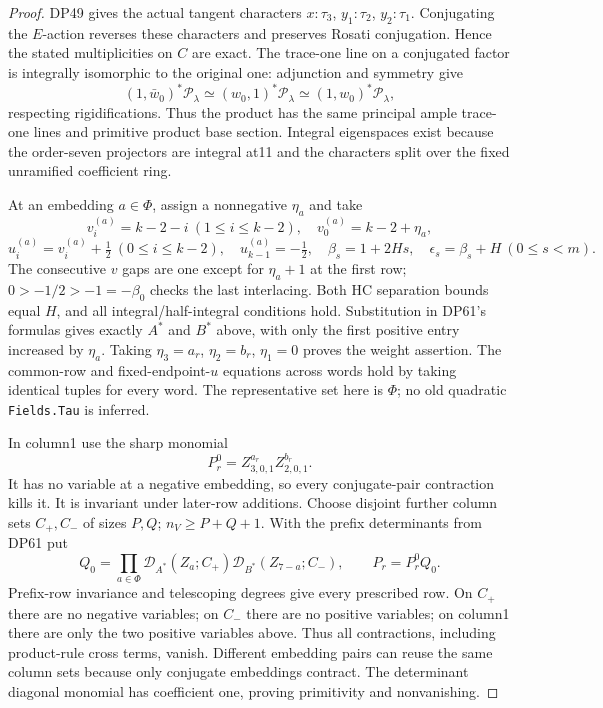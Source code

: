 \documentclass[11pt,a4paper]{article}
\theoremstyle{definition}\newtheorem{remark}[theorem]{Remark}
\begin{document}
\begin{proof}
DP49 gives the actual tangent characters $x:\tau_3$, $y_1:\tau_2$,
$y_2:\tau_1$. Conjugating the $E$-action reverses these characters and
preserves Rosati conjugation. Hence the stated multiplicities on $C$
are exact. The trace-one line on a conjugated factor is integrally
isomorphic to the original one: adjunction and symmetry give
\[
 (1,\bar w_0)^*\mathcal P_\lambda
 \simeq(w_0,1)^*\mathcal P_\lambda
 \simeq(1,w_0)^*\mathcal P_\lambda,
\]
respecting rigidifications. Thus the product has the same principal ample
trace-one lines and primitive product base section. Integral eigenspaces
exist because the order-seven projectors are integral at11 and the
characters split over the fixed unramified coefficient ring.

At an embedding $a\in\Phi$, assign a nonnegative $\eta_a$ and take
\[
 v_i^{(a)}=k-2-i\ (1\le i\le k-2),\quad
 v_0^{(a)}=k-2+\eta_a,
\]
\[
 u_i^{(a)}=v_i^{(a)}+\tfrac12\ (0\le i\le k-2),\quad
 u_{k-1}^{(a)}=-\tfrac12,
 \quad\beta_s=1+2Hs,\quad\epsilon_s=\beta_s+H\ (0\le s<m).
\]
The consecutive $v$ gaps are one except for $\eta_a+1$ at the first
row; $0>-1/2>-1=-\beta_0$ checks the last interlacing.
Both HC separation bounds equal $H$, and all integral/half-integral
conditions hold. Substitution in DP61's formulas gives exactly $A^*$
and $B^*$ above, with only the first positive entry increased by
$\eta_a$. Taking $\eta_3=a_r$, $\eta_2=b_r$, $\eta_1=0$ proves the
weight assertion. The common-row and fixed-endpoint-$u$ equations across
words hold by taking identical tuples for every word. The representative
set here is $\Phi$; no old quadratic \texttt{Fields.Tau} is inferred.

In column1 use the sharp monomial
\[
 P_r^0=Z_{3,0,1}^{a_r}Z_{2,0,1}^{b_r}.
\]
It has no variable at a negative embedding, so every conjugate-pair
contraction kills it. It is invariant under later-row additions.
Choose disjoint further column sets $C_+,C_-$ of sizes $P,Q$;
$n_V\ge P+Q+1$. With the prefix determinants from DP61 put
\[
 Q_0=\prod_{a\in\Phi}\mathcal D_{A^*}(Z_a;C_+)
                            \mathcal D_{B^*}(Z_{7-a};C_-),
 \qquad P_r=P_r^0Q_0.
\]
Prefix-row invariance and telescoping degrees give every prescribed row.
On $C_+$ there are no negative variables; on $C_-$ there are no positive
variables; on column1 there are only the two positive variables above.
Thus all contractions, including product-rule cross terms, vanish.
Different embedding pairs can reuse the same column sets because only
conjugate embeddings contract. The determinant diagonal monomial has
coefficient one, proving primitivity and nonvanishing.


\end{proof}
\end{document}
